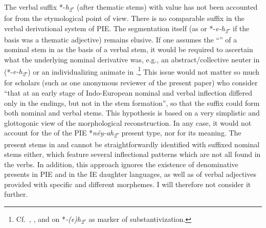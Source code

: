\documentclass[output=paper,colorlinks,citecolor=brown]{langscibook}
\begin{document}
The verbal suffix *-\textit{h\textsubscript{2}}- (after thematic stems) with  value has not been accounted for from the etymological point of view. There is no comparable suffix in the verbal derivational system of PIE. The segmentation itself (as  or *-\textit{e-h\textsubscript{2}}- if the basis was a thematic adjective) remains elusive. If one assumes the “” of a nominal stem in  as the basis of a verbal stem, it would be required to ascertain what the underlying nominal derivative was, e.g., an abstract/collective neuter in  (*-\textit{e-h\textsubscript{2}}-) or an individualizing animate in .\footnote{Cf.\  \citealt{Melchert2014}, \citealt[274--275, 306]{Nussbaum2014coll}, and \citealt{FellnerGrestenberger2016}   on \mbox{*\textit{-(e)h\textsubscript{2}}-} as marker of substantivization.}  This issue would not matter so much for scholars (such as one anonymous reviewer of the present paper) who consider “that at an early stage of Indo-European nominal and verbal inflection differed only in the endings, but not in the stem formation”, so that the suffix  could form both nominal and verbal stems. This hypothesis is based on a very simplistic and glottogonic view of the morphological reconstruction. In any case, it would not account for the  of the PIE *\textit{néu̯-ah\textsubscript{2}}- present type, nor for its  meaning. The present stems in  and   cannot be straightforwardly identified with suffixed nominal stems either, which feature several inflectional patterns which are not all found in the verbs. In addition, this approach ignores the existence of denominative presents in PIE and in the IE daughter languages, as well as of verbal adjectives provided with specific and different morphemes. I will therefore not consider it further.
\end{document}
